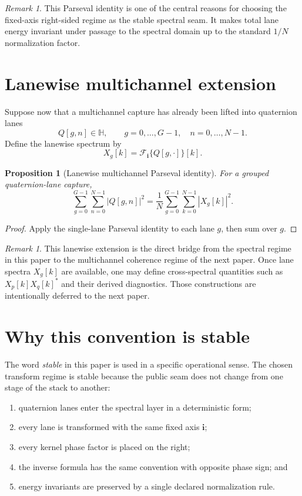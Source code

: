 \documentclass[11pt]{article}
\newtheorem{proposition}[definition]{Proposition}
\theoremstyle{remark}
\newtheorem{remark}[definition]{Remark}
\newcommand{\HH}{\mathbb{H}}
\newcommand{\ii}{\mathbf{i}}
\newcommand{\F}{\mathcal{F}_{\ii}}
\newcommand{\abs}[1]{\left\lvert #1 \right\rvert}
\begin{document}
\begin{remark}
This Parseval identity is one of the central reasons for choosing the fixed-axis right-sided regime as the stable spectral seam. It makes total lane energy invariant under passage to the spectral domain up to the standard \(1/N\) normalization factor.
\end{remark}

\section{Lanewise multichannel extension}

Suppose now that a multichannel capture has already been lifted into quaternion lanes
\[
Q[g,n]\in\HH,
\qquad
g=0,\dots,G-1,\quad n=0,\dots,N-1.
\]
Define the lanewise spectrum by
\[
X_g[k]=\F\{Q[g,\cdot]\}[k].
\]

\begin{proposition}[Lanewise multichannel Parseval identity]
For a grouped quaternion-lane capture,
\[
\sum_{g=0}^{G-1}\sum_{n=0}^{N-1}\abs{Q[g,n]}^2
=
\frac1N
\sum_{g=0}^{G-1}\sum_{k=0}^{N-1}\abs{X_g[k]}^2.
\]
\end{proposition}

\begin{proof}
Apply the single-lane Parseval identity to each lane \(g\), then sum over \(g\).
\end{proof}

\begin{remark}
This lanewise extension is the direct bridge from the spectral regime in this paper to the multichannel coherence regime of the next paper. Once lane spectra \(X_g[k]\) are available, one may define cross-spectral quantities such as \(X_p[k]X_q[k]^*\) and their derived diagnostics. Those constructions are intentionally deferred to the next paper.
\end{remark}

\section{Why this convention is stable}

The word \emph{stable} in this paper is used in a specific operational sense. The chosen transform regime is stable because the public seam does not change from one stage of the stack to another:
\begin{enumerate}[label=(\arabic*)]
    \item quaternion lanes enter the spectral layer in a deterministic form;
    \item every lane is transformed with the same fixed axis \(\ii\);
    \item every kernel phase factor is placed on the right;
    \item the inverse formula has the same convention with opposite phase sign; and
    \item energy invariants are preserved by a single declared normalization rule.
\end{enumerate}
\end{document}
